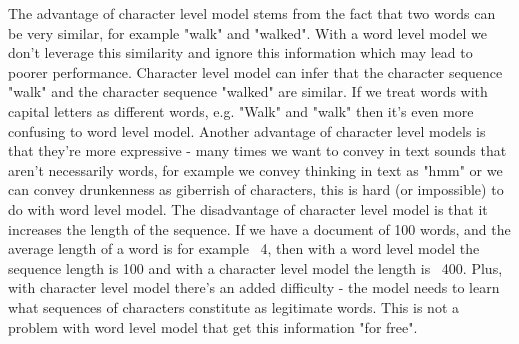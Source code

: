The advantage of character level model stems from the fact that two words can be very similar, for example "walk" and "walked". 
With a word level model we don't leverage this similarity and ignore this information which may lead to poorer performance. 
Character level model can infer that the character sequence "walk" and the character sequence "walked" are similar. If we treat words with capital 
letters as different words, e.g. "Walk" and "walk" then it's even more confusing to word level model. 
Another advantage of character level models is that they're more expressive - many times we want to convey in text sounds that aren't necessarily words, for example we convey thinking in text as "hmm" or we can convey drunkenness as giberrish of characters, 
this is hard (or impossible) to do with word level model.
The disadvantage of character level model is that it increases the length of the sequence. If we have a document of 100 words, 
and the average length of a word is for example ~4, then with a word level model the sequence length is 100 and with a character 
level model the length is ~400. Plus, with character level model there's an added difficulty - the model needs to learn what sequences of characters 
constitute as legitimate words. This is not a problem with word level model that get this information "for free".